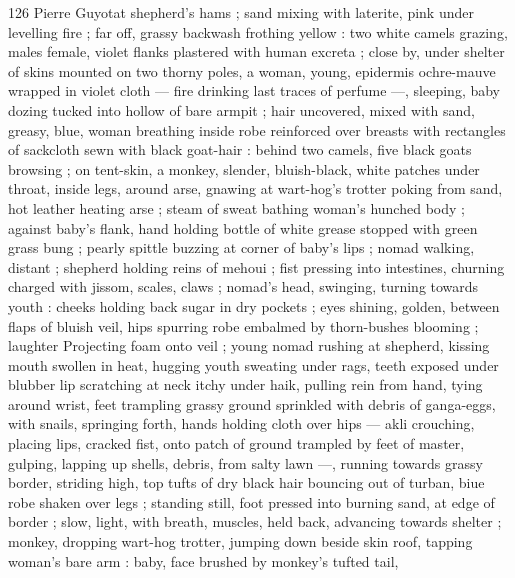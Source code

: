 126 Pierre Guyotat
shepherd’s hams ; sand mixing with laterite, pink under levelling fire
; far off, grassy backwash frothing yellow : two white camels grazing,
males female, violet flanks plastered with human excreta ; close by,
under shelter of skins mounted on two thorny poles, a woman,
young, epidermis ochre-mauve wrapped in violet cloth — fire
drinking last traces of perfume —, sleeping, baby dozing tucked into
hollow of bare armpit ; hair uncovered, mixed with sand, greasy,
blue, woman breathing inside robe reinforced over breasts with
rectangles of sackcloth sewn with black goat-hair : behind two
camels, five black goats browsing ; on tent-skin, a monkey, slender,
bluish-black, white patches under throat, inside legs, around arse,
gnawing at wart-hog's trotter poking from sand, hot leather heating
arse ; steam of sweat bathing woman's hunched body ; against
baby’s flank, hand holding bottle of white grease stopped with green
grass bung ; pearly spittle buzzing at corner of baby’s lips ; nomad
walking, distant ; shepherd holding reins of mehoui ; fist pressing
into intestines, churning charged with jissom, scales, claws ; nomad’s
head, swinging, turning towards youth : cheeks holding back sugar
in dry pockets ; eyes shining, golden, between flaps of bluish veil,
hips spurring robe embalmed by thorn-bushes blooming ; laughter
Projecting foam onto veil ; young nomad rushing at shepherd, kissing
mouth swollen in heat, hugging youth sweating under rags, teeth
exposed under blubber lip scratching at neck itchy under haik,
pulling rein from hand, tying around wrist, feet trampling grassy
ground sprinkled with debris of ganga-eggs, with snails, springing
forth, hands holding cloth over hips — akli crouching, placing lips,
cracked fist, onto patch of ground trampled by feet of master,
gulping, lapping up shells, debris, from salty lawn —, running
towards grassy border, striding high, top tufts of dry black hair
bouncing out of turban, biue robe shaken over legs ; standing still,
foot pressed into burning sand, at edge of border ; slow, light, with
breath, muscles, held back, advancing towards shelter ; monkey,
dropping wart-hog trotter, jumping down beside skin roof, tapping
woman's bare arm : baby, face brushed by monkey's tufted tail,

